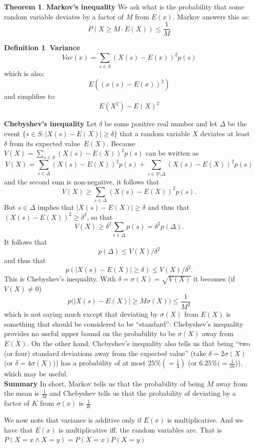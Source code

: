 \documentclass[titlepage]{article}
\theoremstyle{definition}
\newtheorem{theorem}{Theorem}[section]
\newtheorem{definition}{Definition}
\numberwithin{equation}{subsection}
\numberwithin{remark}{subsection}
\begin{document}
\begin{theorem}\textbf{Markov's inequality}
We ask what is the probability that some random variable deviates by a factor of $M$ from $E(x)$. Markov answers this as:
$$P(X \geq M \cdot E(X)) \leq \frac{1}{M}$$
\end{theorem}

\begin{definition}\textbf{Variance}
$$Var(x) = \sum_{s\in S} (X(s) - E(x))^{2}p(s)$$
which is also:
$$E((x(s) - E(x))^{2})$$
and simplifies to:
$$E(X^{2}) - E(X)^{2}$$
\end{definition}

{\bf Chebyshev's inequality} Let $\delta$ be some positive real number and let $\Delta$ be the event $\{s\in S: |X(s)-E(X)|\ge\delta\}$ that a random variable $X$ deviates at least~$\delta$ from its expected value~$E(X)$.
Because $V(X)=\sum_{s\in S}(X(s)-E(X))^2p(s)$ can be written as
$$V(X)=\sum_{s\in \Delta}(X(s)-E(X))^2p(s) + \sum_{s\in S\setminus\Delta}(X(s)-E(X))^2p(s)$$
and the second sum is non-negative, it follows that
$$V(X)\ge\sum_{s\in \Delta}(X(s)-E(X))^2p(s).$$
But $s\in \Delta$ implies that $|X(s)-E(X)|\ge\delta$ and thus that $(X(s)-E(X))^2\ge\delta^2$, so that
$$V(X)\ge\delta^2\sum_{s\in \Delta}p(s)=\delta^2p(\Delta).$$
It follows that
$$p(\Delta)\le V(X)/\delta^2$$
and thus that
$$p(|X(s)-E(X)|\ge\delta)\le V(X)/\delta^2.$$
This is Chebyshev's inequality.
With $\delta =\sigma(X)= \sqrt{V(X)}$ it becomes (if $V(X)\ne 0$)$$p\big(|X(s)-E(X)|\geq M\sigma(X)\big)\leq \frac{1}{M^{2}}$$which is not saying much except that deviating by $\sigma(X)$ from $E(X)$ is something that should be considered to be ``standard'':
Chebyshev's inequality provides no useful upper bound on the probability to be $\sigma(X)$ away from $E(X)$.
On the other hand, Chebyshev's inequality also tells us that being ``two (or four) standard deviations away from the expected value'' (take $\delta=2\sigma(X)$ (or $\delta=4\sigma(X)$)) has a probability of at most $25\%(=\frac14)$ (or $6.25\%(=\frac1{16}$)), which may be useful.
\\

\textbf{Summary} In short, Markov tells us that the probability of being $M$ away from the mean is $\frac{1}{M}$ and Chebyshev tells us that the probability of deviating by a factor of $K$ from $\sigma(x)$ is $\frac{1}{K}$ 

We now note that variance is additive only if $E(x)$ is multiplicative. And we have that $E(x)$ is multiplicative iff. the random variables are. That is $P( X = x \land X = y) = P(X=x)P(X = y)$
\end{document}
